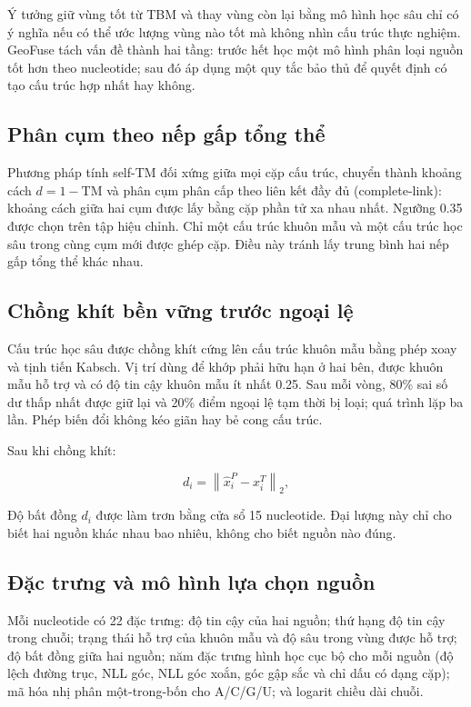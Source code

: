 \documentclass[12pt,a4paper,oneside]{report}
\begin{document}
Ý tưởng giữ vùng tốt từ TBM và thay vùng còn lại bằng mô hình học sâu chỉ có ý nghĩa
nếu có thể ước lượng vùng nào tốt mà không nhìn cấu trúc thực nghiệm. GeoFuse tách vấn
đề thành hai tầng: trước hết học một mô hình phân loại nguồn tốt hơn theo nucleotide;
sau đó áp dụng một quy tắc bảo thủ để quyết định có tạo cấu trúc hợp nhất hay không.

\subsection{Phân cụm theo nếp gấp tổng thể}

Phương pháp tính self-TM đối xứng giữa mọi cặp cấu trúc, chuyển thành khoảng cách
$d=1-\mathrm{TM}$ và phân cụm phân cấp theo liên kết đầy đủ (complete-link): khoảng
cách giữa hai cụm được lấy bằng cặp phần tử xa nhau nhất. Ngưỡng 0.35 được chọn trên
tập hiệu chỉnh. Chỉ một cấu trúc khuôn mẫu và một cấu trúc học sâu trong cùng cụm mới
được ghép cặp. Điều này tránh lấy trung bình hai nếp gấp tổng thể khác nhau.

\subsection{Chồng khít bền vững trước ngoại lệ}

Cấu trúc học sâu được chồng khít cứng lên cấu trúc khuôn mẫu bằng phép xoay và tịnh tiến
Kabsch. Vị trí dùng để khớp phải hữu hạn ở hai bên, được khuôn mẫu hỗ trợ và có độ tin
cậy khuôn mẫu ít nhất 0.25. Sau mỗi vòng, 80\% sai số dư thấp nhất được giữ lại và 20\%
điểm ngoại lệ tạm thời bị loại; quá trình lặp ba lần. Phép biến đổi không kéo giãn hay
bẻ cong cấu trúc.

Sau khi chồng khít:

\begin{equation}
d_i=\left\|\widehat{x}_i^{P}-x_i^{T}\right\|_2,
\end{equation}

Độ bất đồng $d_i$ được làm trơn bằng cửa sổ 15 nucleotide. Đại lượng này chỉ cho biết
hai nguồn khác nhau bao nhiêu, không cho biết nguồn nào đúng.

\subsection{Đặc trưng và mô hình lựa chọn nguồn}

Mỗi nucleotide có 22 đặc trưng: độ tin cậy của hai nguồn; thứ hạng độ tin cậy trong
chuỗi; trạng thái hỗ trợ của khuôn mẫu và độ sâu trong vùng được hỗ trợ; độ bất đồng giữa
hai nguồn; năm đặc trưng hình học cục bộ cho mỗi nguồn (độ lệch đường trục, NLL góc, NLL
góc xoắn, góc gập sắc và chỉ dấu có dạng cặp); mã hóa nhị phân một-trong-bốn cho A/C/G/U;
và logarit chiều dài chuỗi.
\end{document}
